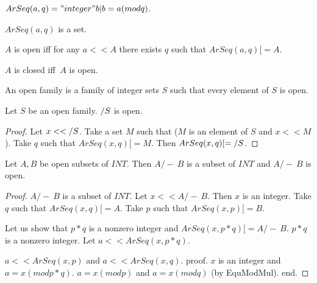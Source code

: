 \documentclass{document}
\begin{document}
  \begin{forthel}

    \begin{definition}[ArSeq]
      $ArSeq(a,q) = { "integer" b | b = a (mod q) }$.
    \end{definition}

    \begin{lemma}
      $ArSeq(a,q)$ is a set.
    \end{lemma}

    \begin{definition}[Open]
      $A$ is open iff for any $a << A$ there exists $q$ such that $ArSeq(a,q) [= A$.
    \end{definition}

    \begin{definition}[Closed]
      $A$ is closed iff $~A$ is open.
    \end{definition}

    \begin{definition}[OpenIntegerSets]
      An open family is a family of integer sets $S$ such that every element of $S$ is open.
    \end{definition}

    \begin{lemma}[UnionOpen]
      Let $S$ be an open family. $\-/ S$ is open.
    \end{lemma}
    \begin{proof}
      Let $x << \-/ S$. Take a set $M$ such that ($M$ is an element of $S$ and $x << M$). Take $q$ such that $ArSeq(x,q) [= M$. Then $ArSeq(x,q) [= \-/ S$.
    \end{proof}

    \begin{lemma}[InterOpen]
      Let $A,B$ be open subsets of $INT$. Then $A /-\ B$ is a subset of $INT$ and $A /-\ B$ is open.
    \end{lemma}
    \begin{proof}
      $A /-\ B$ is a subset of $INT$. Let $x << A /-\ B$. Then $x$ is an integer. Take $q$ such that $ArSeq(x,q) [= A$. Take $p$ such that $ArSeq(x,p) [= B$.

      Let us show that $p*q$ is a nonzero integer and $ArSeq(x, p * q) [= A /-\ B$.
        $p*q$ is a nonzero integer. Let $a << ArSeq(x, p * q)$.

        $a << ArSeq (x, p)$ and $a << ArSeq (x, q)$.
        proof.
          $x$ is an integer and $a = x (mod p * q)$. $a = x (mod p)$ and $a = x (mod q)$ (by EquModMul).
        end.


\end{proof}
\end{forthel}
\end{document}
